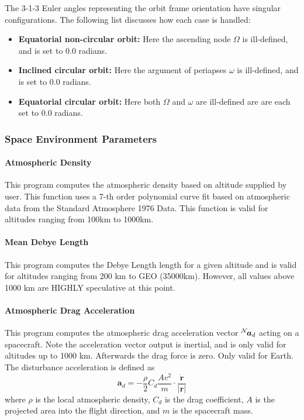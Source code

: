 The 3-1-3 Euler angles representing the orbit frame orientation have singular configurations.  The following list discusses how each case is handled:
\begin{itemize}
	\item {\bfseries Equatorial non-circular orbit:} Here the ascending node $\Omega$ is ill-defined, and is  set to 0.0 radians.  
	\item {\bfseries Inclined circular orbit:}  Here the argument of periapses $\omega$ is ill-defined, and is set to 0.0 radians.
	\item {\bfseries Equatorial circular orbit:} Here both $\Omega$ and $\omega$ are ill-defined are are each set to 0.0 radians.
\end{itemize}















\subsubsection{Space Environment Parameters}
\paragraph{Atmospheric Density}
This program computes the atmospheric density based on altitude  supplied by user.  This function uses a 7-th order polynomial curve fit based on  atmospheric data from the Standard Atmosphere 1976 Data. This function is valid for altitudes ranging from 100km to 1000km.

\paragraph{Mean Debye Length}
This program computes the Debye Length length for a given  altitude and is valid for altitudes ranging  from 200 km to GEO (35000km).  However, all values above   1000 km are HIGHLY speculative at this point.

\paragraph{Atmospheric Drag Acceleration}
This program computes the atmospheric drag acceleration   vector $\leftexp{N}{\bm a}_{d}$ acting on a spacecraft.   Note the acceleration vector output is inertial, and is   only valid for altitudes up to 1000 km.   Afterwards the drag force is zero. Only valid for Earth.  The disturbance acceleration is defined as
\begin{equation}
	\bm a_{d} = -\frac{\rho}{2} C_{d} \frac{A v^{2}}{m} \cdot \frac{\dot{\bm r}}{|\bm r|}
\end{equation}
where $\rho$ is the local atmospheric density, $C_{d}$ is the drag coefficient, $A$ is the projected area into the flight direction, and $m$ is the spacecraft mass.


